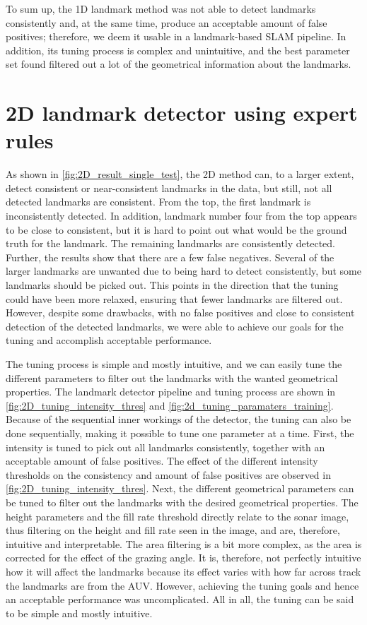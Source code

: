 To sum up, the 1D landmark method was not able to detect landmarks consistently and, at the same time, produce an acceptable amount of false positives; therefore, we deem it usable in a landmark-based SLAM pipeline. In addition, its tuning process is complex and unintuitive, and the best parameter set found filtered out a lot of the geometrical information about the landmarks. 

\section{2D landmark detector using expert rules}

As shown in \cref{fig:2D_result_single_test}, the 2D method can, to a larger extent, detect consistent or near-consistent landmarks in the data, but still, not all detected landmarks are consistent. From the top, the first landmark is inconsistently detected. In addition, landmark number four from the top appears to be close to consistent, but it is hard to point out what would be the ground truth for the landmark. The remaining landmarks are consistently detected. Further, the results show that there are a few false negatives. Several of the larger landmarks are unwanted due to being hard to detect consistently, but some landmarks should be picked out. This points in the direction that the tuning could have been more relaxed, ensuring that fewer landmarks are filtered out. However, despite some drawbacks, with no false positives and close to consistent detection of the detected landmarks, we were able to achieve our goals for the tuning and accomplish acceptable performance. 

The tuning process is simple and mostly intuitive, and we can easily tune the different parameters to filter out the landmarks with the wanted geometrical properties. The landmark detector pipeline and tuning process are shown in \cref{fig:2D_tuning_intensity_thres} and \cref{fig:2d_tuning_paramaters_training}. Because of the sequential inner workings of the detector, the tuning can also be done sequentially, making it possible to tune one parameter at a time. First, the intensity is tuned to pick out all landmarks consistently, together with an acceptable amount of false positives. The effect of the different intensity thresholds on the consistency and amount of false positives are observed in \cref{fig:2D_tuning_intensity_thres}. Next, the different geometrical parameters can be tuned to filter out the landmarks with the desired geometrical properties. The height parameters and the fill rate threshold directly relate to the sonar image, thus filtering on the height and fill rate seen in the image, and are, therefore, intuitive and interpretable. The area filtering is a bit more complex, as the area is corrected for the effect of the grazing angle. It is, therefore, not perfectly intuitive how it will affect the landmarks because its effect varies with how far across track the landmarks are from the AUV. However, achieving the tuning goals and hence an acceptable performance was uncomplicated. All in all, the tuning can be said to be simple and mostly intuitive. 

